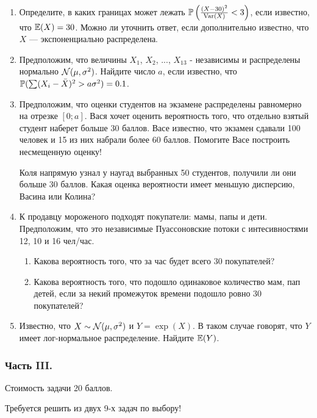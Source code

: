 \begin{enumerate}
\item Определите, в каких границах может лежать $\P\left(\frac{(X-30)^{2}}{\Var(X)}<3\right)$, если известно, что $\E(X)=30$. Можно ли уточнить ответ, если дополнительно известно, что $X$ — экспоненциально распределена.

\item Предположим, что величины $X_{1}$, $X_{2}$, ..., $X_{13}$ - независимы и распределены нормально $\cN(\mu,\sigma^{2})$. Найдите число $a$, если известно, что $\P( \sum (X_{i}-\bar{X})^{2}>a\sigma^{2})=0.1$.
\item Предположим, что оценки студентов на экзамене распределены равномерно на отрезке $[0;a]$. Вася хочет оценить вероятность того, что отдельно взятый студент наберет больше 30 баллов. Васе известно, что экзамен сдавали 100 человек и 15 из них набрали более 60 баллов. Помогите Васе построить несмещенную оценку!

Коля напрямую узнал у наугад выбранных 50 студентов, получили ли они больше 30 баллов. Какая оценка вероятности имеет меньшую дисперсию, Васина или Колина?


\item К продавцу мороженого подходят покупатели: мамы, папы и дети. Предположим, что это независимые Пуассоновские потоки с интесивностями 12, 10 и 16 чел/час.
\begin{enumerate}
\item Какова вероятность того, что за час будет всего 30 покупателей?
\item Какова вероятность того, что подошло одинаковое количество мам, пап детей, если за некий промежуток времени подошло ровно 30 покупателей?
\end{enumerate}

\item Известно, что $X\sim \cN(\mu,\sigma^{2})$ и $Y=\exp(X)$. В таком случае говорят, что $Y$ имеет лог-нормальное распределение. Найдите $\E(Y)$.
\end{enumerate}


\subsubsection*{Часть III.}

Стоимость задачи 20 баллов.

Требуется решить \textbf{} из двух 9-х задач по
выбору!

